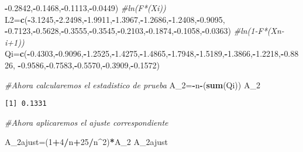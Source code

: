 \documentclass[
  a4paper,
  oneside,
  openany]{book}
\newenvironment{Shaded}{\begin{snugshade}}{\end{snugshade}}
\newcommand{\CommentTok}[1]{\textcolor[rgb]{0.56,0.35,0.01}{\textit{#1}}}
\newcommand{\DecValTok}[1]{\textcolor[rgb]{0.00,0.00,0.81}{#1}}
\newcommand{\FloatTok}[1]{\textcolor[rgb]{0.00,0.00,0.81}{#1}}
\newcommand{\FunctionTok}[1]{\textcolor[rgb]{0.13,0.29,0.53}{\textbf{#1}}}
\newcommand{\NormalTok}[1]{#1}
\newcommand{\OtherTok}[1]{\textcolor[rgb]{0.56,0.35,0.01}{#1}}
\newcommand{\SpecialCharTok}[1]{\textcolor[rgb]{0.81,0.36,0.00}{\textbf{#1}}}
\begin{document}
\begin{Shaded}
\begin{Highlighting}[]
      \SpecialCharTok{{-}}\FloatTok{0.2842}\NormalTok{,}\SpecialCharTok{{-}}\FloatTok{0.1468}\NormalTok{,}\SpecialCharTok{{-}}\FloatTok{0.1113}\NormalTok{,}\SpecialCharTok{{-}}\FloatTok{0.0449}\NormalTok{)    }\CommentTok{\#ln(F*(Xi))}
\NormalTok{L2}\OtherTok{=}\FunctionTok{c}\NormalTok{(}\SpecialCharTok{{-}}\FloatTok{3.1245}\NormalTok{,}\SpecialCharTok{{-}}\FloatTok{2.2498}\NormalTok{,}\SpecialCharTok{{-}}\FloatTok{1.9911}\NormalTok{,}\SpecialCharTok{{-}}\FloatTok{1.3967}\NormalTok{,}\SpecialCharTok{{-}}\FloatTok{1.2686}\NormalTok{,}\SpecialCharTok{{-}}\FloatTok{1.2408}\NormalTok{,}\SpecialCharTok{{-}}\FloatTok{0.9095}\NormalTok{,}
\SpecialCharTok{{-}}\FloatTok{0.7123}\NormalTok{,}\SpecialCharTok{{-}}\FloatTok{0.5628}\NormalTok{,}\SpecialCharTok{{-}}\FloatTok{0.3555}\NormalTok{,}\SpecialCharTok{{-}}\FloatTok{0.3545}\NormalTok{,}\SpecialCharTok{{-}}\FloatTok{0.2103}\NormalTok{,}\SpecialCharTok{{-}}\FloatTok{0.1874}\NormalTok{,}\SpecialCharTok{{-}}\FloatTok{0.1058}\NormalTok{,}\SpecialCharTok{{-}}\FloatTok{0.0363}\NormalTok{)  }\CommentTok{\#ln(1{-}F*(Xn{-}i+1))}
\NormalTok{Qi}\OtherTok{=}\FunctionTok{c}\NormalTok{(}\SpecialCharTok{{-}}\FloatTok{0.4303}\NormalTok{,}\SpecialCharTok{{-}}\FloatTok{0.9096}\NormalTok{,}\SpecialCharTok{{-}}\FloatTok{1.2525}\NormalTok{,}\SpecialCharTok{{-}}\FloatTok{1.4275}\NormalTok{,}\SpecialCharTok{{-}}\FloatTok{1.4865}\NormalTok{,}\SpecialCharTok{{-}}\FloatTok{1.7948}\NormalTok{,}\SpecialCharTok{{-}}\FloatTok{1.5189}\NormalTok{,}\SpecialCharTok{{-}}\FloatTok{1.3866}\NormalTok{,}\SpecialCharTok{{-}}\FloatTok{1.2218}\NormalTok{,}\SpecialCharTok{{-}}\FloatTok{0.8826}\NormalTok{,}
\SpecialCharTok{{-}}\FloatTok{0.9586}\NormalTok{,}\SpecialCharTok{{-}}\FloatTok{0.7583}\NormalTok{,}\SpecialCharTok{{-}}\FloatTok{0.5570}\NormalTok{,}\SpecialCharTok{{-}}\FloatTok{0.3909}\NormalTok{,}\SpecialCharTok{{-}}\FloatTok{0.1572}\NormalTok{)}

\CommentTok{\#Ahora calcularemos el estadistico de prueba}
\NormalTok{A\_2}\OtherTok{=}\SpecialCharTok{{-}}\NormalTok{n}\SpecialCharTok{{-}}\NormalTok{(}\FunctionTok{sum}\NormalTok{(Qi))}
\NormalTok{A\_2}
\end{Highlighting}
\end{Shaded}

\begin{verbatim}
[1] 0.1331
\end{verbatim}

\begin{Shaded}
\begin{Highlighting}[]
\CommentTok{\#Ahora aplicaremos el ajuste correspondiente}

\NormalTok{A\_2ajust}\OtherTok{=}\NormalTok{(}\DecValTok{1}\SpecialCharTok{+}\DecValTok{4}\SpecialCharTok{/}\NormalTok{n}\SpecialCharTok{+}\DecValTok{25}\SpecialCharTok{/}\NormalTok{n}\SpecialCharTok{\^{}}\DecValTok{2}\NormalTok{)}\SpecialCharTok{*}\NormalTok{A\_2}
\NormalTok{A\_2ajust}
\end{Highlighting}
\end{Shaded}
\end{document}
